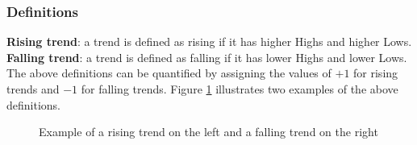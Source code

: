 \documentclass[a4, 11pt]{article}
\begin{document}
\subsubsection{Definitions}
\textbf{Rising trend}: a trend is defined as rising if it has higher Highs and higher Lows.\\
\textbf{Falling trend}: a trend is defined as falling if it has lower Highs and lower Lows.\\[2ex]
The above definitions can be quantified by assigning the values of $+1$ for rising trends and $-1$ for falling trends. Figure \ref{fig:RisingAndFalling} illustrates two examples of the above definitions. 
\begin{figure}[!ht]
    \centering
    \qquad
    \caption{Example of a rising trend on the left and a falling trend on the right}%
    \label{fig:RisingAndFalling}
\end{figure}
\end{document}
